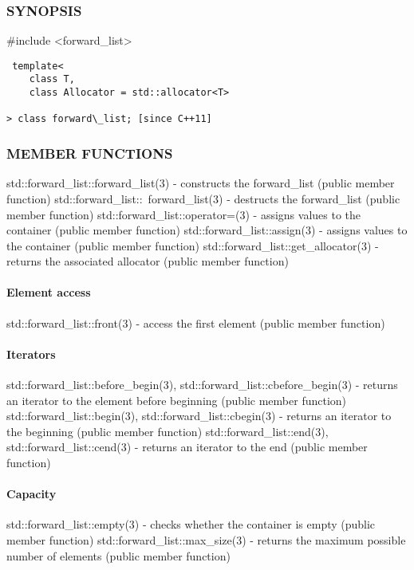\subsubsection{SYNOPSIS}
\#include <forward\_list>

\begin{lstlisting}
 template<
    class T,
    class Allocator = std::allocator<T>

> class forward\_list; [since C++11]
\end{lstlisting}

\subsubsection{MEMBER FUNCTIONS}
std::forward\_list::forward\_list(3) - constructs the forward\_list  (public member function)
std::forward\_list::~forward\_list(3) - destructs the forward\_list  (public member function)
std::forward\_list::operator=(3) - assigns values to the container   (public member function)
std::forward\_list::assign(3) - assigns values to the container   (public member function)
std::forward\_list::get\_allocator(3) - returns the associated allocator   (public member function)
\paragraph{Element access}
std::forward\_list::front(3) - access the first element   (public member function)
\paragraph{Iterators}
std::forward\_list::before\_begin(3), std::forward\_list::cbefore\_begin(3) - returns an iterator to the element before beginning   (public member function)
std::forward\_list::begin(3), std::forward\_list::cbegin(3) - returns an iterator to the beginning   (public member function)
std::forward\_list::end(3), std::forward\_list::cend(3) - returns an iterator to the end   (public member function)
\paragraph{Capacity}
std::forward\_list::empty(3) - checks whether the container is empty   (public member function)
std::forward\_list::max\_size(3) - returns the maximum possible number of elements   (public member function)
